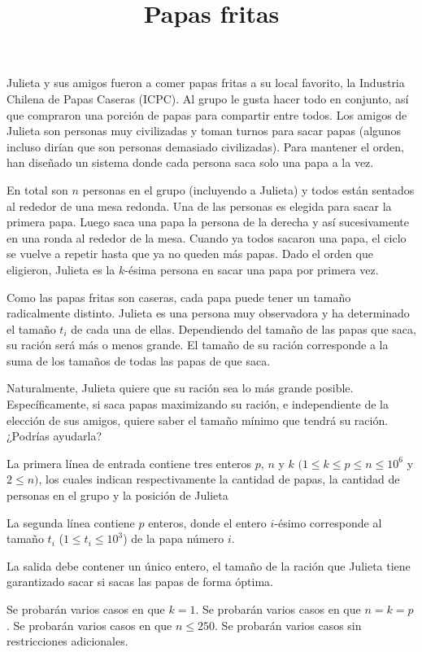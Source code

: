 \documentclass{oci}
\title{Papas fritas}
\begin{document}
\begin{problemDescription}
	Julieta y sus amigos fueron a comer papas fritas a su local favorito,
	la Industria Chilena de Papas Caseras (ICPC).
	Al grupo le gusta hacer todo en conjunto, así que compraron una porción
	de papas para compartir entre todos.
	Los amigos de Julieta son personas muy civilizadas y toman turnos para
	sacar papas (algunos incluso dirían que son personas demasiado civilizadas).
	Para mantener el orden, han diseñado un sistema donde cada
	persona saca solo una papa a la vez.

	En total son $n$ personas en el grupo (incluyendo a Julieta) y todos están
	sentados al rededor de una mesa redonda.
	Una de las personas es elegida para sacar la primera papa.
	Luego saca una papa la persona de la derecha y así sucesivamente en una
	ronda al rededor de la mesa.
	Cuando ya todos sacaron una papa, el ciclo se vuelve a repetir hasta que ya no
	queden más papas.
	Dado el orden que eligieron, Julieta es la $k$-ésima persona en sacar una papa
	por primera vez.

	Como las papas fritas son caseras, cada papa puede tener un tamaño radicalmente
	distinto.
	Julieta es una persona muy observadora y ha determinado el tamaño $t_i$ de cada una
	de ellas.
	Dependiendo del tamaño de las papas que saca, su ración será más o menos grande.
	El tamaño de su ración corresponde a la suma de los tamaños de todas
	las papas de que saca.

	Naturalmente, Julieta quiere que su ración sea lo más grande posible.
	Específicamente, si saca papas maximizando su ración, e independiente
	de la elección de sus amigos, quiere saber el tamaño mínimo que tendrá su ración.
	¿Podrías ayudarla?
\end{problemDescription}

\begin{inputDescription}
	La primera línea de entrada contiene tres enteros $p$, $n$ y $k$
	$(1 \leq k \leq p \leq n \leq 10^6$ y $2 \leq n)$, los cuales
	indican respectivamente la cantidad de papas, la cantidad de personas en el grupo
	y la posición de Julieta

	La segunda línea contiene $p$ enteros, donde el entero $i$-ésimo
	corresponde al tamaño $t_i$ ($1 \leq t_i \leq 10^3$) de la papa número $i$.
\end{inputDescription}

\begin{outputDescription}
	La salida debe contener un único entero, el tamaño de la ración que Julieta tiene
	garantizado sacar si sacas las papas de forma óptima.
\end{outputDescription}

\begin{scoreDescription}
  	Se probarán varios casos en que $k = 1$.
 	Se probarán varios casos en que $n = k = p$.
  	Se probarán varios casos en que $n \leq 250$.
	Se probarán varios casos sin restricciones adicionales.
\end{scoreDescription}

\begin{sampleDescription}
\end{sampleDescription}
\end{document}
